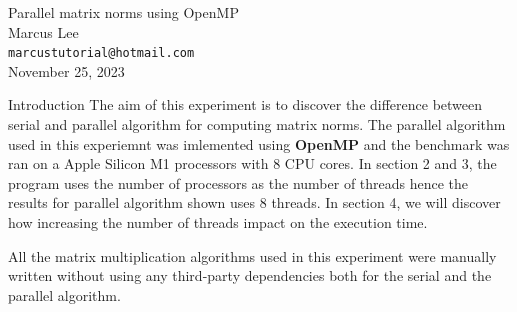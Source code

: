 \documentclass[12pt]{article}
\begin{document}
\begin{center}
    {\LARGE Parallel matrix norms using OpenMP} \\[0.6cm]

    Marcus Lee \\
    \texttt{\small marcustutorial@hotmail.com} \\[0.3cm]

    \small November 25, 2023
\end{center}

\begin{section}{Introduction}
 The aim of this experiment is to discover the difference between serial and parallel algorithm for computing matrix norms. The
 parallel algorithm used in this experiemnt was imlemented using \textbf{OpenMP} and the benchmark was ran on a Apple Silicon M1 processors with 8 CPU cores.
 In section 2 and 3, the program uses the number of processors as the number of threads hence the results for parallel algorithm shown uses 8 threads.
 In section 4, we will discover how increasing the number of threads impact on the execution time.

 All the matrix multiplication algorithms used in this experiment were manually written without using any third-party dependencies both for
 the serial and the parallel algorithm.
\end{section}
\end{document}

